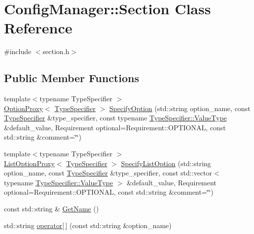 \hypertarget{class_config_manager_1_1_section}{}\section{Config\+Manager\+:\+:Section Class Reference}
\label{class_config_manager_1_1_section}


{\ttfamily \#include $<$section.\+h$>$}

\subsection*{Public Member Functions}
\begin{DoxyCompactItemize}
\item 
{\footnotesize template$<$typename Type\+Specifier $>$ }\\\hyperlink{class_config_manager_1_1_option_proxy}{Option\+Proxy}$<$ \hyperlink{class_config_manager_1_1_type_specifier}{Type\+Specifier} $>$ \hyperlink{class_config_manager_1_1_section_a94e7c5fe73d725c5cfdab6773f2ec00e}{Specify\+Option} (std\+::string option\+\_\+name, const \hyperlink{class_config_manager_1_1_type_specifier}{Type\+Specifier} \&type\+\_\+specifier, const typename \hyperlink{class_config_manager_1_1_type_specifier_a30331e624a3c4a1c18eb5b838e93acea}{Type\+Specifier\+::\+Value\+Type} \&default\+\_\+value, Requirement optional=Requirement\+::\+O\+P\+T\+I\+O\+N\+AL, const std\+::string \&comment=\char`\"{}\char`\"{})
\item 
{\footnotesize template$<$typename Type\+Specifier $>$ }\\\hyperlink{class_config_manager_1_1_list_option_proxy}{List\+Option\+Proxy}$<$ \hyperlink{class_config_manager_1_1_type_specifier}{Type\+Specifier} $>$ \hyperlink{class_config_manager_1_1_section_a3ebb197102f277aec4a012e073c8a0ca}{Specify\+List\+Option} (std\+::string option\+\_\+name, const \hyperlink{class_config_manager_1_1_type_specifier}{Type\+Specifier} \&type\+\_\+specifier, const std\+::vector$<$ typename \hyperlink{class_config_manager_1_1_type_specifier_a30331e624a3c4a1c18eb5b838e93acea}{Type\+Specifier\+::\+Value\+Type} $>$ \&default\+\_\+value, Requirement optional=Requirement\+::\+O\+P\+T\+I\+O\+N\+AL, const std\+::string \&comment=\char`\"{}\char`\"{})
\item 
const std\+::string \& \hyperlink{class_config_manager_1_1_section_a416bce47977331d53358a888f6995900}{Get\+Name} ()
\item 
std\+::string \hyperlink{class_config_manager_1_1_section_a99a220aa7baafa9131117c6b08b47506}{operator\mbox{[}$\,$\mbox{]}} (const std\+::string \&option\+\_\+name)
\end{DoxyCompactItemize}

